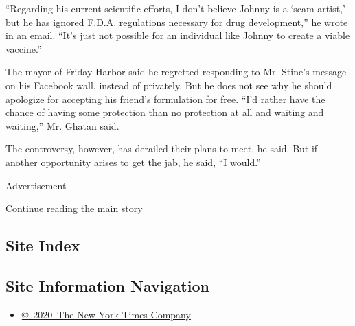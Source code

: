 ``Regarding his current scientific efforts, I don't believe Johnny is a
`scam artist,' but he has ignored F.D.A. regulations necessary for drug
development,'' he wrote in an email. ``It's just not possible for an
individual like Johnny to create a viable vaccine.''

The mayor of Friday Harbor said he regretted responding to Mr. Stine's
message on his Facebook wall, instead of privately. But he does not see
why he should apologize for accepting his friend's formulation for free.
``I'd rather have the chance of having some protection than no
protection at all and waiting and waiting,'' Mr. Ghatan said.

The controversy, however, has derailed their plans to meet, he said. But
if another opportunity arises to get the jab, he said, ``I would.''

Advertisement

\protect\hyperlink{after-bottom}{Continue reading the main story}

\hypertarget{site-index}{%
\subsection{Site Index}\label{site-index}}

\hypertarget{site-information-navigation}{%
\subsection{Site Information
Navigation}\label{site-information-navigation}}

\begin{itemize}
\tightlist
\item
  \href{https://help.nytimes3xbfgragh.onion/hc/en-us/articles/115014792127-Copyright-notice}{©~2020~The
  New York Times Company}
\end{itemize}


